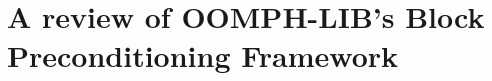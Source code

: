 \documentclass[12pt,a4paper]{report}
\begin{document}
%

\pagestyle{plain}
\setcounter{page}{1}


%

%

%

%

\chapter{A review of OOMPH-LIB's Block Preconditioning Framework\label{chap:block_preconditioning_framework}}


%

%

\thispagestyle{empty}\newpage

\appendix
%
%

\clearpage
{}

\end{document}
